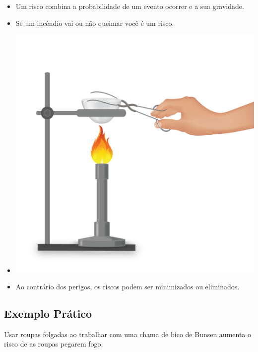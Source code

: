 \documentclass[
  letterpaper,
  DIV=11,
  numbers=noendperiod]{scrartcl}
\providecommand{\tightlist}{%
  \setlength{\itemsep}{0pt}\setlength{\parskip}{0pt}}\usepackage{longtable,booktabs,array}
\begin{document}
\begin{itemize}
\tightlist
\item
  Um risco combina a probabilidade de um evento ocorrer e a sua
  gravidade.
\item
  Se um incêndio vai ou não queimar você é um risco.
\item
  \includegraphics[width=5.20833in,height=\textheight,keepaspectratio]{imagens/image_2.13ea1c26.png}
\end{itemize}

\begin{itemize}
\tightlist
\item
  Ao contrário dos perigos, os riscos podem ser minimizados ou
  eliminados.
\end{itemize}

\subsection{Exemplo Prático}\label{exemplo-pruxe1tico}

Usar roupas folgadas ao trabalhar com uma chama de bico de Bunsen
aumenta o risco de as roupas pegarem fogo.
\end{document}
